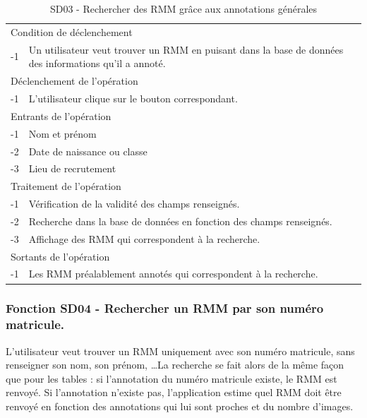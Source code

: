 \documentclass[a4paper]{article}
\begin{document}
\begin{table}[H]
  \centering
   \small
	\begin{tabular}{|c|p{12cm}|}
   		\hline
   			\rowcolor{lightgray}\multicolumn{2}{|c|}{\textbf{SD03 - Rechercher des RMM grâce aux annotations personnelles}} \\
   		\hline
   			\multicolumn{2}{|l|}{Condition de d\'eclenchement} \\
   		\hline
   			-1 & Un utilisateur veut trouver un RMM en puisant dans la base de données des informations qu'il a annoté. \\
   		\hline
   			\multicolumn{2}{|l|}{D\'eclenchement de l'op\'eration} \\
   		\hline
   			-1 & L'utilisateur clique sur le bouton correspondant. \\
   		\hline
   			\multicolumn{2}{|l|}{Entrants de l'op\'eration} \\
   		\hline
   			-1 & Nom et prénom \\
        	-2 & Date de naissance ou classe \\ 
        	-3 & Lieu de recrutement \\ 
   		\hline
   			\multicolumn{2}{|l|}{Traitement de l'op\'eration} \\
  		\hline
  			-1 & Vérification de la validité des champs renseignés. \\
   			-2 & Recherche dans la base de données en fonction des champs renseignés. \\
        	-3 & Affichage des RMM qui correspondent à la recherche. \\
   		\hline
   			\multicolumn{2}{|l|}{Sortants de l'op\'eration} \\
   		\hline
   			-1 & Les RMM préalablement annotés qui correspondent à la recherche. \\
   		\hline
	\end{tabular}
  \caption{SD03 - Rechercher des RMM grâce aux annotations générales}
  \normalsize
  \label{tab:SD03}
\end{table}

\subsubsection{Fonction SD04 - Rechercher un RMM par son numéro matricule.}

L'utilisateur veut trouver un RMM uniquement avec son numéro matricule, sans renseigner son nom, son prénom, \ldots  La recherche se fait alors de la même façon que pour les tables : si l'annotation du numéro matricule existe, le RMM est renvoyé. Si l'annotation n'existe pas, l'application estime quel RMM doit être renvoyé en fonction des annotations qui lui sont proches et du nombre d'images.
\\
\end{document}
